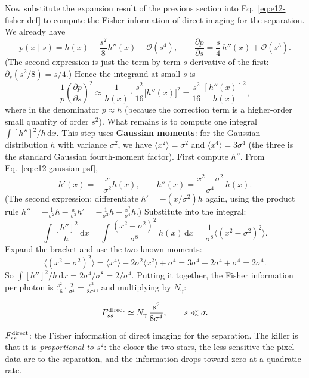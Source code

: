 Now substitute the expansion result of the previous section into Eq.~\eqref{eq:e12-fisher-def} to compute the Fisher information of direct imaging for the separation. We already have
\[
  p(x\mid s)=h(x)+\frac{s^{2}}{8}h''(x)+\mathcal{O}(s^{4}),
  \qquad
  \frac{\partial p}{\partial s}=\frac{s}{4}\,h''(x)+\mathcal{O}(s^{3}).
\]
(The second expression is just the term-by-term $s$-derivative of the first: $\partial_s(s^2/8)=s/4$.) Hence the integrand at small $s$ is
\[
  \frac{1}{p}\left(\frac{\partial p}{\partial s}\right)^{2}
  \approx\frac{1}{h(x)}\cdot\frac{s^{2}}{16}\big[h''(x)\big]^{2}
  =\frac{s^{2}}{16}\,\frac{[h''(x)]^{2}}{h(x)},
\]
where in the denominator $p\approx h$ (because the correction term is a higher-order small quantity of order $s^2$). What remains is to compute one integral $\int [h'']^2/h\,\mathrm{d}x$. This step uses \textbf{Gaussian moments}: for the Gaussian distribution $h$ with variance $\sigma^2$, we have $\langle x^2\rangle=\sigma^2$ and $\langle x^4\rangle=3\sigma^4$ (the three is the standard Gaussian fourth-moment factor). First compute $h''$. From Eq.~\eqref{eq:e12-gaussian-psf},
\[
  h'(x)=-\frac{x}{\sigma^{2}}h(x),\qquad
  h''(x)=\frac{x^{2}-\sigma^{2}}{\sigma^{4}}\,h(x).
\]
(The second expression: differentiate $h'=-(x/\sigma^2)h$ again, using the product rule $h''=-\tfrac1{\sigma^2}h-\tfrac{x}{\sigma^2}h'=-\tfrac1{\sigma^2}h+\tfrac{x^2}{\sigma^4}h$.) Substitute into the integral:
\[
  \int\frac{[h'']^{2}}{h}\,\mathrm{d}x
  =\int\frac{(x^{2}-\sigma^{2})^{2}}{\sigma^{8}}\,h(x)\,\mathrm{d}x
  =\frac{1}{\sigma^{8}}\big\langle(x^{2}-\sigma^{2})^{2}\big\rangle.
\]
Expand the bracket and use the two known moments:
\[
  \big\langle(x^{2}-\sigma^{2})^{2}\big\rangle
  =\langle x^{4}\rangle-2\sigma^{2}\langle x^{2}\rangle+\sigma^{4}
  =3\sigma^{4}-2\sigma^{4}+\sigma^{4}=2\sigma^{4}.
\]
So $\int[h'']^2/h\,\mathrm{d}x=2\sigma^4/\sigma^8=2/\sigma^4$. Putting it together, the Fisher information per photon is $\tfrac{s^2}{16}\cdot\tfrac{2}{\sigma^4}=\tfrac{s^2}{8\sigma^4}$, and multiplying by $N_\gamma$:

\begin{equation}
  F_{ss}^{\rm direct}\simeq N_\gamma\,\frac{s^{2}}{8\sigma^{4}},
  \qquad s\ll\sigma.
  \label{eq:e12-direct-fisher}
\end{equation}
\begin{formulaexplain}
$F_{ss}^{\rm direct}$: the Fisher information of direct imaging for the separation. The killer is that it is \emph{proportional to $s^{2}$}: the closer the two stars, the less sensitive the pixel data are to the separation, and the information drops toward zero at a quadratic rate.
\end{formulaexplain}

